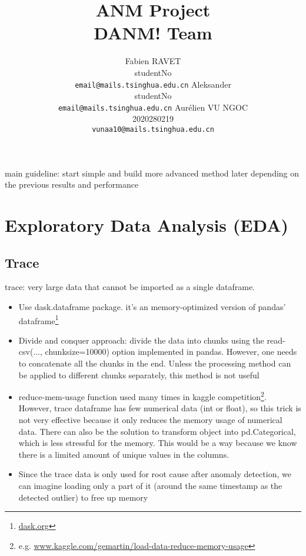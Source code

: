 \documentclass{article}
\title{ANM  Project \\ DANM! Team}
\author{%
 Fabien RAVET\\
 studentNo\\
 \texttt{email@mails.tsinghua.edu.cn}
 \And
 Aleksander\\
 studentNo\\
  \texttt{email@mails.tsinghua.edu.cn}
 \And
 Aurélien VU NGOC\\
 2020280219\\
 \texttt{vunaa10@mails.tsinghua.edu.cn}
}
\begin{document}
\maketitle




main guideline: start simple and build more advanced method later depending on the previous results and performance

\section{Exploratory Data Analysis (EDA)}
    \subsection{Trace}
    trace: very large data that cannot be imported as a single dataframe. 
    \begin{itemize}
        \item Use dask.dataframe package. it's an memory-optimized version of pandas' dataframe\footnote{\url{dask.org}}
        \item Divide and conquer approach: divide the data into chunks using the read-csv(..., chunksize=10000) option implemented in pandas. However, one needs to concatenate all the chunks in the end. Unless the processing method can be applied to different chunks separately, this method is not useful
        \item reduce-mem-usage function used many times in kaggle competition\footnote{e.g. \url{www.kaggle.com/gemartin/load-data-reduce-memory-usage}}. However, trace dataframe has few numerical data (int or float), so this trick is not very effective because it only reduces the memory usage of numerical data. There can also be the solution to transform object into pd.Categorical, which is less stressful for the memory. This would be a way because we know there is a limited amount of unique values in the columns.
        \item Since the trace data is only used for root cause after anomaly detection, we can imagine loading only a part of it (around the same timestamp as the detected outlier) to free up memory
    \end{itemize}
\end{document}
